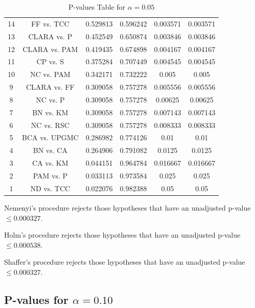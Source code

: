 \documentclass[a4paper,10pt]{article}
\begin{document}
\begin{landscape}
\begin{table}[!htp]
\begin{tabular}{cccccc}
14&FF vs. TCC&0.529813&0.596242&0.003571&0.003571\\
13&CLARA vs. P&0.452549&0.650874&0.003846&0.003846\\
12&CLARA vs. PAM&0.419435&0.674898&0.004167&0.004167\\
11&CP vs. S&0.375284&0.707449&0.004545&0.004545\\
10&NC vs. PAM&0.342171&0.732222&0.005&0.005\\
9&CLARA vs. FF&0.309058&0.757278&0.005556&0.005556\\
8&NC vs. P&0.309058&0.757278&0.00625&0.00625\\
7&BN vs. KM&0.309058&0.757278&0.007143&0.007143\\
6&NC vs. RSC&0.309058&0.757278&0.008333&0.008333\\
5&BCA vs. UPGMC&0.286982&0.774126&0.01&0.01\\
4&BN vs. CA&0.264906&0.791082&0.0125&0.0125\\
3&CA vs. KM&0.044151&0.964784&0.016667&0.016667\\
2&PAM vs. P&0.033113&0.973584&0.025&0.025\\
1&ND vs. TCC&0.022076&0.982388&0.05&0.05\\
\hline
\end{tabular}
\caption{P-values Table for $\alpha=0.05$}
\end{table}Nemenyi's procedure rejects those hypotheses that have an unadjusted p-value $\le0.000327$.

Holm's procedure rejects those hypotheses that have an unadjusted p-value $\le0.000538$.

Shaffer's procedure rejects those hypotheses that have an unadjusted p-value $\le0.000327$.

\pagebreak

\subsection{P-values for $\alpha=0.10$}


\end{landscape}
\end{document}
